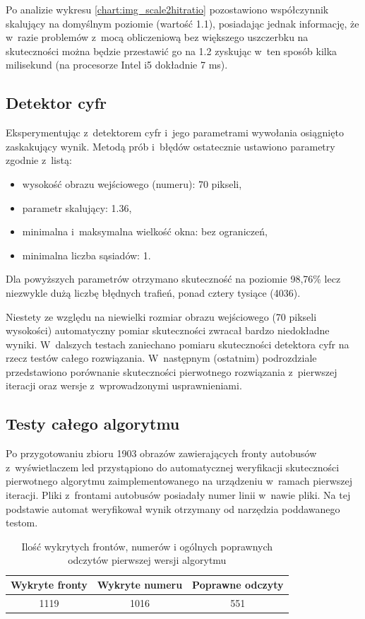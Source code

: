 Po analizie wykresu \ref{chart:img_scale2hitratio}
pozostawiono współczynnik skalujący na 
domyślnym poziomie (wartość 1.1), posiadając
jednak informację, że w~razie problemów z~mocą obliczeniową
bez większego uszczerbku na skuteczności można będzie przestawić
go na 1.2 zyskując w~ten sposób kilka milisekund
(na procesorze Intel i5 dokładnie 7 ms).

\subsection{Detektor cyfr}

Eksperymentując z~detektorem cyfr i~jego parametrami wywołania
osiągnięto zaskakujący wynik. Metodą prób i~błędów ostatecznie
ustawiono parametry zgodnie z~listą:
\begin{itemize}
    \item wysokość obrazu wejściowego (numeru): 70 pikseli,
    \item parametr skalujący: 1.36,
    \item minimalna i~maksymalna wielkość okna: bez ograniczeń,
    \item minimalna liczba sąsiadów: 1.
\end{itemize}
Dla powyższych parametrów otrzymano skuteczność na poziomie 98,76\%
lecz niezwykle dużą liczbę błędnych trafień, ponad cztery tysiące
(4036).

Niestety ze względu na niewielki rozmiar obrazu wejściowego
(70 pikseli wysokości) automatyczny pomiar skuteczności
zwracał bardzo niedokładne wyniki. W~dalszych testach
zaniechano pomiaru skuteczności detektora cyfr na rzecz testów
całego rozwiązania. W~następnym (ostatnim) podrozdziale przedstawiono
porównanie skuteczności pierwotnego rozwiązania z~pierwszej iteracji
oraz wersje z~wprowadzonymi usprawnieniami.

\subsection{Testy całego algorytmu}

Po przygotowaniu zbioru 1903 obrazów zawierających fronty autobusów
z~wyświetlaczem led przystąpiono do automatycznej weryfikacji 
skuteczności pierwotnego algorytmu zaimplementowanego na urządzeniu
w~ramach pierwszej iteracji.
Pliki z~frontami autobusów posiadały numer linii w~nawie pliki. 
Na tej podstawie automat weryfikował wynik otrzymany od narzędzia
poddawanego testom.


\begin{table}[!h]
    \centering
    \begin{tabular}{c|c|c}
        Wykryte fronty  & Wykryte numeru & Poprawne odczyty \\ \hline
        1119 & 1016 & 551
    \end{tabular}
    \caption{Ilość wykrytych frontów, numerów i ogólnych poprawnych 
    odczytów pierwszej wersji algorytmu}
    \label{tab:first_version_results}
\end{table}

